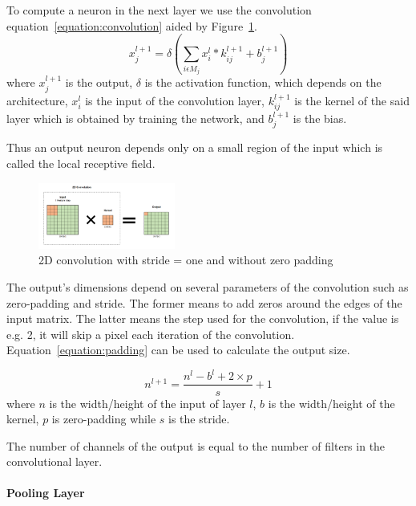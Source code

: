 \documentclass[conference]{IEEEtran}
\begin{document}
To compute a neuron in the next layer we use the convolution
equation~\ref{equation:convolution} aided by Figure~\ref{Cl}.
\begin{equation} \label{equation:convolution}
    \displaystyle x_{j}^{l+1}=\delta (\sum_{i \epsilon M_{j}}x_{i}^{l} * k_{ij}^{l+1}+ b_{j}^{l+1})
\end{equation}
where $x_{j}^{l+1}$ is the output, $\delta$ is the activation function, which
depends on the architecture, $x_{i}^{l}$ is the input of the convolution layer,
$k_{ij}^{l+1}$ is the kernel of the said layer which is obtained by training the
network, and $b_{j}^{l+1}$ is the bias.

Thus an output neuron depends only on a small region of the input which is
called the local receptive field.

\begin{figure}[!htb]
    \centering
    \includegraphics[width=0.4\textwidth]{Figures/conv.png}
    \caption{2D convolution with stride = one and without zero padding}
    \label{Cl}
\end{figure} 


The output's dimensions depend on several parameters of the convolution such as
zero-padding and stride. The former means to add zeros around the edges of the
input matrix. The latter means the step used for the convolution, if the value
is e.g. 2, it will skip a pixel each iteration of the convolution.
Equation~\ref{equation:padding} can be used to calculate the output size.

\begin{equation} \label{equation:padding}
     n^{l+1} = \frac{n^{l}- b^{l}+2 \times p}{s} + 1
\end{equation}
where $n$ is the width/height of the input of layer $l$, $ b$ is the
width/height of the kernel, $p$ is zero-padding while $s$ is the stride.

The number of channels of the output is equal to the number of filters in the
convolutional layer.


\paragraph{Pooling Layer}
\end{document}
